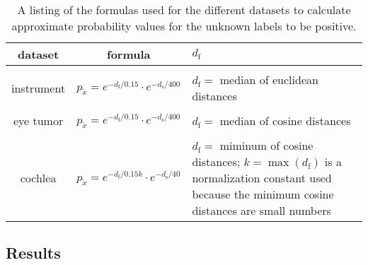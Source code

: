 \begin{table}[ht]
	\centering
	  \caption{A listing of the formulas used for the different datasets to calculate approximate probability values for the unknown labels to be positive.}
	  \label{tab:probabilities}
	\begin{tabular}{ | c  c  p{7cm} | }
	\hline
	  dataset	& formula 								& $d_{\text{f}}$  \\ \hline
			& & \\
	  instrument  	& $p_{\tilde x} = e^{-d_{\text{f}}/0.15} \cdot e^{-d_{\text{s}}/400}$ 	& $d_{\text{f}} = $ median of euclidean distances  \\ 
	  & & \\
	  eye tumor	& $p_{\tilde x} = e^{-d_{\text{f}}/0.15} \cdot e^{-d_{\text{s}}/400}$ 	& $d_{\text{f}} = $ median of cosine distances 	  \\ 
	  & & \\
	  cochlea 	& $p_{\tilde x} = e^{-d_{\text{f}}/0.15k} \cdot e^{-d_{\text{s}}/40}$ 	& $d_{\text{f}} = $ miminum of cosine distances; $k = \max(d_\text{f})$ is a normalization constant used because the minimum cosine distances are small numbers\\ \hline
	\end{tabular}
\end{table}

\subsection{Results}
